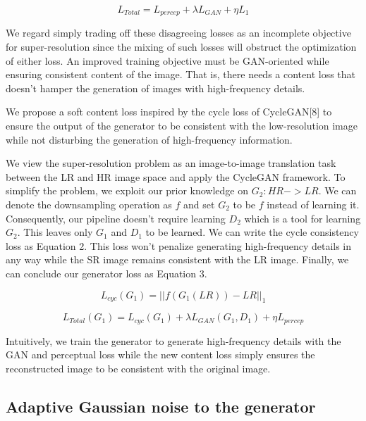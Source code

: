 \documentclass{article}
\begin{document}
\begin{equation} 
\label{metric}
L_{Total} = L_{percep} + \lambda L_{GAN} + \eta L_{1}
\end{equation}


We regard simply trading off these disagreeing losses as an incomplete objective for super-resolution since the mixing of such losses will obstruct the optimization of either loss. An improved training objective must be GAN-oriented while ensuring consistent content of the image. That is, there needs a content loss that doesn't hamper the generation of images with high-frequency details.

We propose a soft content loss inspired by the cycle loss of CycleGAN[8] to ensure the output of the generator to be consistent with the low-resolution image while not disturbing the generation of high-frequency information.


We view the super-resolution problem as an image-to-image translation task between the LR and HR image space and apply the CycleGAN framework. To simplify the problem, we exploit our prior knowledge on $G_{2}: HR->LR$. We can denote the downsampling operation as $f$ and set $G_{2}$ to be $f$ instead of learning it. Consequently, our pipeline doesn't require learning $D_{2}$ which is a tool for learning $G_{2}$. This leaves only $G_{1}$ and $D_{1}$ to be learned. We can write the cycle consistency loss as Equation 2. This loss won't penalize generating high-frequency details in any way while the SR image remains consistent with the LR image. Finally, we can conclude our generator loss as Equation 3.

\begin{equation} 
\label{metric}
L_{cyc}(G_{1}) = ||f(G_{1}(LR)) - LR||_{1}
\end{equation}


\begin{equation} 
    \label{metric}
    L_{Total}(G_{1}) = L_{cyc}(G_{1}) + \lambda L_{GAN}(G_{1}, D_{1}) + \eta L_{percep}
\end{equation}

Intuitively, we train the generator to generate high-frequency details with the GAN and perceptual loss while the new content loss simply ensures the reconstructed image to be consistent with the original image. 
\subsection{Adaptive Gaussian noise to the generator}
\end{document}
